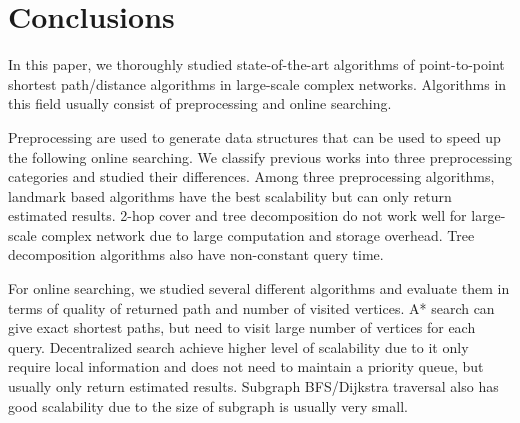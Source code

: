 \section{Conclusions}
\label{conclusion}

In this paper, we thoroughly studied state-of-the-art algorithms of point-to-point shortest path/distance algorithms in large-scale complex networks. Algorithms in this field usually consist of preprocessing and online searching. 

Preprocessing are used to generate data structures that can be used to speed up the following online searching. We classify previous works into three preprocessing categories and studied their differences. Among three preprocessing algorithms, landmark based algorithms have the best scalability but can only return estimated results. 2-hop cover and tree decomposition do not work well for large-scale complex network due to large computation and storage overhead. Tree decomposition algorithms also have non-constant query time. 

For online searching, we studied several different algorithms and evaluate them in terms of quality of returned path and number of visited vertices. A* search can give exact shortest paths, but need to visit large number of vertices for each query. Decentralized search achieve higher level of scalability due to it only require local information and does not need to maintain a priority queue, but usually only return estimated results. Subgraph BFS/Dijkstra traversal also has good scalability due to the size of subgraph is usually very small. 
